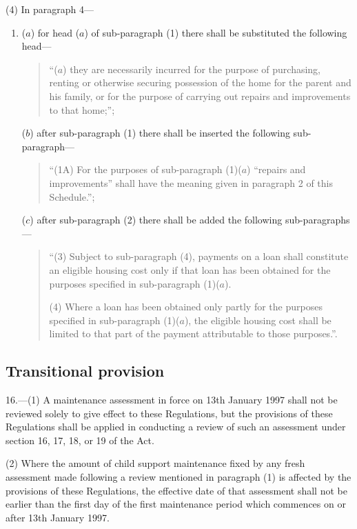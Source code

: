 \documentclass[a4paper]{article}
\begin{document}
(4) In paragraph 4—
\begin{enumerate}\item[]
($a$) for head ($a$) of sub-paragraph (1) there shall be substituted the following head—
\begin{quotation}
“($a$) they are necessarily incurred for the purpose of purchasing, renting or otherwise securing possession of the home for the parent and his family, or for the purpose of carrying out repairs and improvements to that home;”;
\end{quotation}

($b$) after sub-paragraph (1) there shall be inserted the following sub-paragraph—
\begin{quotation}
“(1A) For the purposes of sub-paragraph (1)($a$) “repairs and improvements” shall have the meaning given in paragraph 2 of this Schedule.”;
\end{quotation}

($c$) after sub-paragraph (2) there shall be added the following sub-paragraphs—
\begin{quotation}
“(3) Subject to sub-paragraph (4), payments on a loan shall constitute an eligible housing cost only if that loan has been obtained for the purposes specified in sub-paragraph (1)($a$).

(4) Where a loan has been obtained only partly for the purposes specified in sub-paragraph (1)($a$), the eligible housing cost shall be limited to that part of the payment attributable to those purposes.”.
\end{quotation}
\end{enumerate}

\subsection[16. Transitional provision]{Transitional provision}

16.—(1) A maintenance assessment in force on 13th January 1997 shall not be reviewed solely to give effect to these Regulations, but the provisions of these Regulations shall be applied in conducting a review of such an assessment under section 16, 17, 18, or 19 of the Act.

(2) Where the amount of child support maintenance fixed by any fresh assessment made following a review mentioned in paragraph (1) is affected by the provisions of these Regulations, the effective date of that assessment shall not be earlier than the first day of the first maintenance period which commences on or after 13th January 1997.
\end{document}
